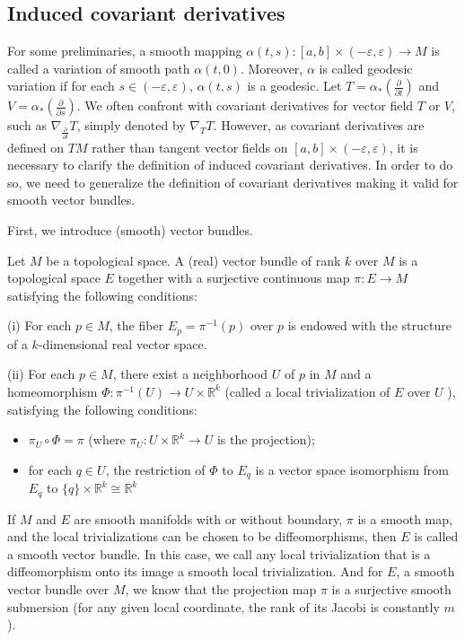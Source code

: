 \documentclass{ctexart}
\begin{document}
\subsection*{Induced covariant derivatives}

For some preliminaries, a smooth mapping $\alpha(t,s):[a,b]\times(-\varepsilon,\varepsilon)\rightarrow M$ is called a variation of smooth path $\alpha(t,0)$.  
Moreover, $\alpha$ is called geodesic variation if for each $s\in (-\varepsilon,\varepsilon)$, $\alpha(t,s)$ is a geodesic. 
Let $T=\alpha_*\left(\frac{\partial}{\partial t}\right)$ and $V=\alpha_*\left(\frac{\partial}{\partial s}\right)$. 
We often confront with covariant derivatives for vector field $T$ or $V$, such as $\nabla_{\frac{\partial}{\partial t}} T$, simply denoted by $\nabla_T T$. 
However, as covariant derivatives are defined on $TM$ rather than tangent vector fields on $[a,b]\times(-\varepsilon,\varepsilon)$, it is necessary to clarify 
the definition of induced covariant derivatives. In order to do so, we need to generalize the definition of covariant derivatives making it valid for smooth vector bundles. 

First, we introduce (smooth) vector bundles.
\begin{definition}
  Let $M$ be a topological space. A (real) vector bundle of rank $k$ over $M$ is a topological space $E$ together with 
  a surjective continuous map $\pi: E \rightarrow M$ satisfying the following conditions:

  (i) For each $p \in M$, the fiber $E_p=\pi^{-1}(p)$ over $p$ is endowed with the structure of a $k$-dimensional real vector space.

  (ii) For each $p \in M$, there exist a neighborhood $U$ of $p$ in $M$ and a homeomorphism $\Phi: \pi^{-1}(U) \rightarrow U \times \mathbb{R}^k$ 
  (called a local trivialization of $E$ over $U$ ), satisfying the following conditions:
  \begin{itemize}
    \item $\pi_U \circ \Phi=\pi$ (where $\pi_U: U \times \mathbb{R}^k \rightarrow U$ is the projection);
    \item for each $q \in U$, the restriction of $\Phi$ to $E_q$ is a vector space isomorphism from $E_q$ to $\{q\} \times \mathbb{R}^k \cong \mathbb{R}^k$
  \end{itemize}
\end{definition}
If $M$ and $E$ are smooth manifolds with or without boundary, $\pi$ is a smooth map, and the local trivializations can be chosen to be diffeomorphisms, 
then $E$ is called a smooth vector bundle. In this case, we call any local trivialization that is a diffeomorphism onto its image a smooth local trivialization. 
And for $E$, a smooth vector bundle over $M$, we know that the projection map $\pi$ is a surjective smooth submersion (for any given local coordinate, 
the rank of its Jacobi is constantly $m$).
\end{document}
